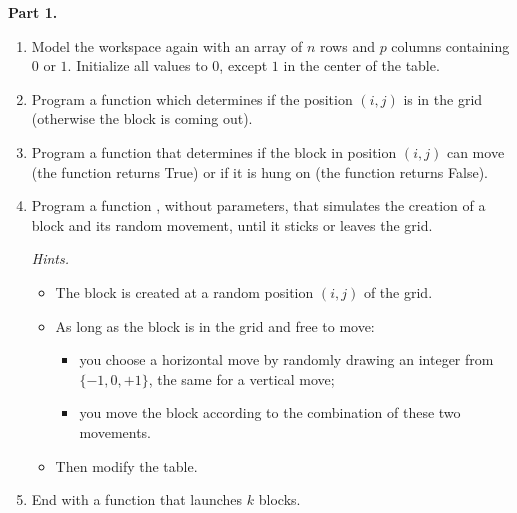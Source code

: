 \documentclass[11pt,class=report,crop=false]{standalone}
\begin{document}

\begin{activite}


\textbf{Part 1.}

\begin{enumerate}
  \item Model the workspace again with an array of $n$ rows and $p$ columns containing $0$ or $1$. Initialize all values to $0$, except $1$ in the center of the table.
  
  \item Program a function  which determines if the position $(i,j)$ is in the grid (otherwise the block is coming out).
    
  \item Program a function  that determines if the block in position $(i,j)$ can move (the function returns \og{}True\fg{}) or if it is hung on (the function returns \og{}False\fg{}).

  \item Program a function , without parameters, that simulates the creation of a block and its random movement, until it sticks or leaves the grid.
  
  \emph{Hints.}
  \begin{itemize}
    \item The block is created at a random position $(i,j)$ of the grid.
    \item As long as the block is in the grid and free to move:
    \begin{itemize}
      \item you choose a horizontal move by randomly drawing an integer from $\{-1,0,+1\}$, the same for a vertical move;
      \item you move the block according to the combination of these two movements.
    \end{itemize}  
    \item Then modify the table.      
  \end{itemize}

  
    \item End with a function  that launches $k$ blocks.   
\end{enumerate}



\end{activite}
\end{document}
